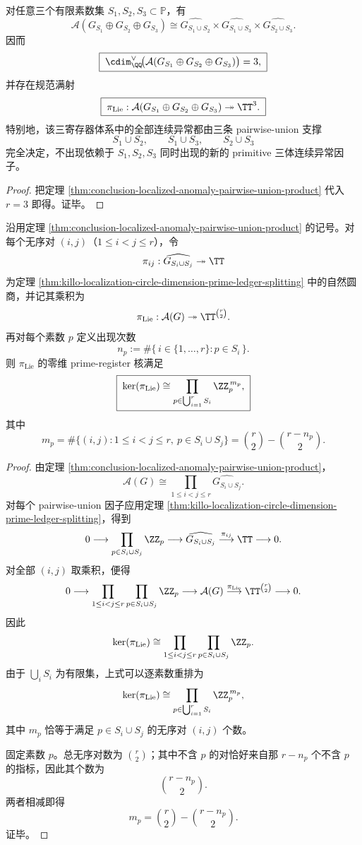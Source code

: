 \begin{corollary}\label{cor:conclusion-localized-three-register-no-primitive-triple-anomaly}
对任意三个有限素数集 \(S_1,S_2,S_3\subset\mathbb P\)，有
\[
\boxed{\;
\mathcal A(G_{S_1}\oplus G_{S_2}\oplus G_{S_3})
\cong
\widehat{G_{S_1\cup S_2}}
\times
\widehat{G_{S_1\cup S_3}}
\times
\widehat{G_{S_2\cup S_3}}.\;}
\]
因而
\[
\boxed{\;
\cdim_{\QQ}^{\vee}\!\bigl(\mathcal A(G_{S_1}\oplus G_{S_2}\oplus G_{S_3})\bigr)=3,\;}
\]
并存在规范满射
\[
\boxed{\;
\pi_{\mathrm{Lie}}:\mathcal A(G_{S_1}\oplus G_{S_2}\oplus G_{S_3})\twoheadrightarrow \TT^3.\;}
\]
特别地，该三寄存器体系中的全部连续异常都由三条 pairwise-union 支撑
\[
S_1\cup S_2,\qquad
S_1\cup S_3,\qquad
S_2\cup S_3
\]
完全决定，不出现依赖于 \(S_1,S_2,S_3\) 同时出现的新的 primitive 三体连续异常因子。
\end{corollary}
\begin{proof}
把定理 \ref{thm:conclusion-localized-anomaly-pairwise-union-product} 代入 \(r=3\) 即得。证毕。
\end{proof}

\begin{theorem}\label{thm:conclusion-localized-anomaly-prime-ledger-multiplicity}
沿用定理 \ref{thm:conclusion-localized-anomaly-pairwise-union-product} 的记号。对每个无序对 \((i,j)\)（\(1\le i<j\le r\)），令
\[
\pi_{ij}:\widehat{G_{S_i\cup S_j}}\twoheadrightarrow \TT
\]
为定理 \ref{thm:killo-localization-circle-dimension-prime-ledger-splitting} 中的自然圆商，并记其乘积为
\[
\pi_{\mathrm{Lie}}:\mathcal A(G)\twoheadrightarrow \TT^{\binom r2}.
\]
再对每个素数 \(p\) 定义出现次数
\[
n_p:=\#\{\,i\in\{1,\dots,r\}: p\in S_i\,\}.
\]
则 \(\pi_{\mathrm{Lie}}\) 的零维 prime-register 核满足
\[
\boxed{\;
\ker(\pi_{\mathrm{Lie}})
\cong
\prod_{p\in \bigcup_{i=1}^r S_i}\ZZ_p^{\,m_p},\;}
\]
其中
\[
\boxed{\;
m_p
=
\#\bigl\{(i,j):1\le i<j\le r,\ p\in S_i\cup S_j\bigr\}
=
\binom r2-\binom{r-n_p}{2}.\;}
\]
\end{theorem}
\begin{proof}
由定理 \ref{thm:conclusion-localized-anomaly-pairwise-union-product}，
\[
\mathcal A(G)\cong \prod_{1\le i<j\le r}\widehat{G_{S_i\cup S_j}}.
\]
对每个 pairwise-union 因子应用定理 \ref{thm:killo-localization-circle-dimension-prime-ledger-splitting}，得到
\[
0\longrightarrow \prod_{p\in S_i\cup S_j}\ZZ_p
\longrightarrow
\widehat{G_{S_i\cup S_j}}
\overset{\pi_{ij}}{\longrightarrow}
\TT
\longrightarrow 0.
\]
对全部 \((i,j)\) 取乘积，便得
\[
0\longrightarrow
\prod_{1\le i<j\le r}\prod_{p\in S_i\cup S_j}\ZZ_p
\longrightarrow
\mathcal A(G)
\overset{\pi_{\mathrm{Lie}}}{\longrightarrow}
\TT^{\binom r2}
\longrightarrow 0.
\]
因此
\[
\ker(\pi_{\mathrm{Lie}})
\cong
\prod_{1\le i<j\le r}\prod_{p\in S_i\cup S_j}\ZZ_p.
\]
由于 \(\bigcup_iS_i\) 为有限集，上式可以逐素数重排为
\[
\ker(\pi_{\mathrm{Lie}})
\cong
\prod_{p\in \bigcup_{i=1}^rS_i}\ZZ_p^{\,m_p},
\]
其中 \(m_p\) 恰等于满足 \(p\in S_i\cup S_j\) 的无序对 \((i,j)\) 个数。

固定素数 \(p\)。总无序对数为 \(\binom r2\)；其中不含 \(p\) 的对恰好来自那 \(r-n_p\) 个不含 \(p\) 的指标，因此其个数为
\[
\binom{r-n_p}{2}.
\]
两者相减即得
\[
m_p=\binom r2-\binom{r-n_p}{2}.
\]
证毕。
\end{proof}

